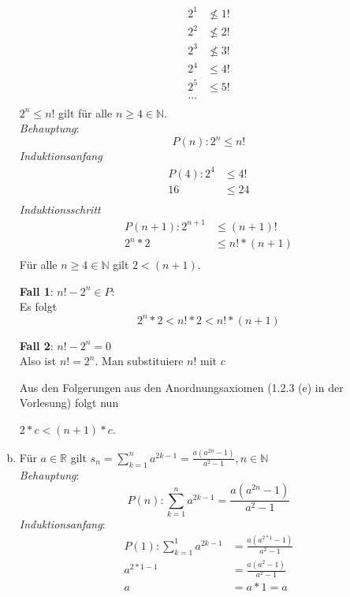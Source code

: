 \documentclass{article}
\begin{document}
\begin{enumerate}[a)]
  \begin{align*}
    2^1 &\nleq 1! \\
    2^2 &\nleq 2! \\
    2^3 &\nleq 3! \\
    2^4 &\leq 4! \\
    2^5 &\leq 5! \\
    \ldots \\
  \end{align*}
  $2^n \leq n!$ gilt für alle $n \geq 4 \in \mathbb{N}$. \\
  \emph{Behauptung}:
  \[
    P(n) \colon 2^n \leq n! 
  \]
  \emph{Induktionsanfang}
  \begin{align*}
    P(4) \colon 2^4 &\leq 4! \\
                 16 &\leq 24 \\
  \end{align*}
  \emph{Induktionsschritt}
  \begin{align*}
    P(n + 1) \colon 2^{n + 1} &\leq (n + 1)! \\
                      2^n * 2 &\leq n! * (n + 1) \\
  \end{align*}
  Für alle $n \geq 4 \in \mathbb{N}$ gilt $2 < (n + 1)$. \\
  
  \begin{minipage}[t]{.45\textwidth}
    \textbf{Fall 1}: $n! - 2^n \in P$: \\
    
    Es folgt
    \[
      2^n * 2 < n! * 2 < n! * (n + 1)
    \]
  \end{minipage}
  \hfill
  \vrule
  \hfill
  \begin{minipage}[t]{.45\textwidth}
    \textbf{Fall 2}: $n! - 2^n = 0$ \\

    Also ist $n! = 2^n$. Man substituiere $n!$ mit $c$
    
    Aus den Folgerungen aus den Anordnungsaxiomen (1.2.3 (e) in der Vorlesung) folgt nun
    
    $2 * c < (n + 1) * c$.
  \end{minipage}

\newpage
\item Für $a \in \mathbb{R}$ gilt $s_n = \sum\limits_{k = 1}^n a^{2k - 1} = \frac{a(a^{2n} - 1)}{a^2 - 1}, n \in \mathbb{N}$ \\
  \emph{Behauptung}:
  \[
    P(n) \colon \sum\limits_{k = 1}^n a^{2k - 1} = \frac{a(a^{2n} - 1)}{a^2 - 1} 
  \]
  \emph{Induktionsanfang}:
  \begin{align*}
    P(1) \colon \sum\limits_{k = 1}^1 a^{2k - 1} &= \frac{a(a^{2 * 1} - 1)}{a^2 - 1}  \\
                                   a^{2 * 1 - 1} &= \frac{a(a^2 - 1)}{a^2 - 1}  \\
                                               a &= a * 1 = a \\
  \end{align*}


\end{enumerate}
\end{document}
